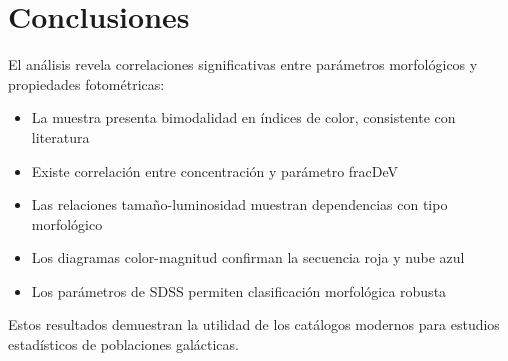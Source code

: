 \documentclass[twocolumn]{article}
\begin{document}
\section{Conclusiones}

El análisis revela correlaciones significativas entre parámetros morfológicos y propiedades fotométricas:

\begin{itemize}
    \item La muestra presenta bimodalidad en índices de color, consistente con literatura
    \item Existe correlación entre concentración y parámetro fracDeV
    \item Las relaciones tamaño-luminosidad muestran dependencias con tipo morfológico
    \item Los diagramas color-magnitud confirman la secuencia roja y nube azul
    \item Los parámetros de SDSS permiten clasificación morfológica robusta
\end{itemize}

Estos resultados demuestran la utilidad de los catálogos modernos para estudios estadísticos de poblaciones galácticas.







\end{document}
